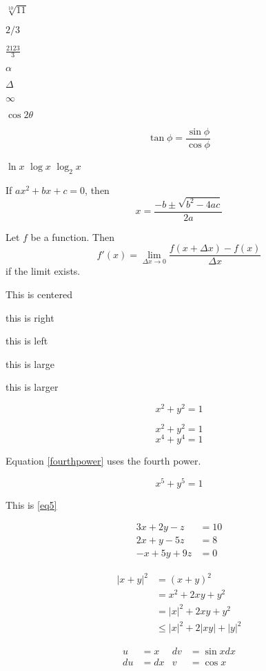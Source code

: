 \documentclass{article}
\begin{document}
$\sqrt[10]{11}$

$2/3$

$\displaystyle{\frac{2123}{3}}$

$\alpha$

$\Delta$

$\infty$

$\cos 2 \theta$

$$\tan \phi = \frac{\sin \phi}{\cos \phi}$$

$\ln x$
$\log x$
$\log_2 x$

If $ax^2 + bx + c = 0$, then
$$x = \frac{-b \pm \sqrt{b^2 - 4ac}}{2a}$$

Let $f$ be a function. Then
$$f'(x) = \lim_{\Delta x \rightarrow 0} \frac{f(x + \Delta x) - f(x)}{\Delta x}$$
if the limit exists.

\begin{center}
This is centered
\end{center}

\begin{flushright}
this is right
\end{flushright}

\begin{flushleft}
this is left
\end{flushleft}

\begin{large}
this is large
\end{large}
\begin{Large}
this is larger
\end{Large}

$$x^2 + y^2 = 1$$

\[x^2 + y^2 = 1\]
\begin{equation}\label{fourthpower}
x^4 + y^4 = 1
\end{equation}

Equation \ref{fourthpower} uses the fourth power.

\begin{equation*}\tag{Eq 5}\label{eq5}
x^5 + y^5 = 1
\end{equation*}

This is \ref{eq5}

\begin{align}
3x + 2y - z &= 10 \\
2x + y - 5z &= 8 \\
-x + 5y + 9z &= 0
\end{align}

\begin{align*}
|x + y|^2 &= (x+y)^2 \\
&= x^2 + 2xy + y^2 \\
&= |x|^2 + 2xy + y^2 \\
&\leq |x|^2 + 2|xy| + |y|^2
\end{align*}

\begin{align}
u &= x & dv &= \sin x dx \\
du &= dx & v &= \cos x
\end{align}
\end{document}
